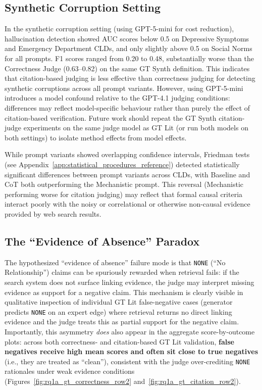 \subsection{Synthetic Corruption Setting}

In the synthetic corruption setting (using GPT-5-mini for cost reduction), hallucination detection showed AUC scores below 0.5 on Depressive Symptoms and Emergency Department CLDs, and only slightly above 0.5 on Social Norms for all prompts. F1 scores ranged from 0.20 to 0.48, substantially worse than the Correctness Judge (0.63--0.82) on the same GT Synth definition. This indicates that citation-based judging is less effective than correctness judging for detecting synthetic corruptions across all prompt variants. However, using GPT-5-mini introduces a model confound relative to the GPT-4.1 judging conditions: differences may reflect model-specific behaviour rather than purely the effect of citation-based verification. Future work should repeat the GT Synth citation-judge experiments on the same judge model as GT Lit (or run both models on both settings) to isolate method effects from model effects.

While prompt variants showed overlapping confidence intervals, Friedman tests (see Appendix~\ref{app:statistical_procedures_reference}) detected statistically significant differences between prompt variants across CLDs, with Baseline and CoT both outperforming the Mechanistic prompt. This reversal (Mechanistic performing worse for citation judging) may reflect that formal causal criteria interact poorly with the noisy or correlational or otherwise non-causal evidence provided by web search results.

\subsection{The ``Evidence of Absence'' Paradox}

The hypothesized ``evidence of absence'' failure mode is that \texttt{NONE} (``No Relationship'') claims can be spuriously rewarded when retrieval fails: if the search system does not surface linking evidence, the judge may interpret missing evidence as support for a negative claim. This mechanism is clearly visible in qualitative inspection of individual GT Lit false-negative cases (generator predicts \texttt{NONE} on an expert edge) where retrieval returns no direct linking evidence and the judge treats this as partial support for the negative claim. Importantly, this asymmetry \textit{does} also appear in the aggregate score-by-outcome plots: across both correctness- and citation-based GT Lit validation, \textbf{false negatives receive high mean scores and often sit close to true negatives} (i.e., they are treated as ``clean''), consistent with the judge over-crediting \texttt{NONE} rationales under weak evidence conditions (Figures~\ref{fig:rq1a_gt_correctness_row2} and~\ref{fig:rq1a_gt_citation_row2}).

